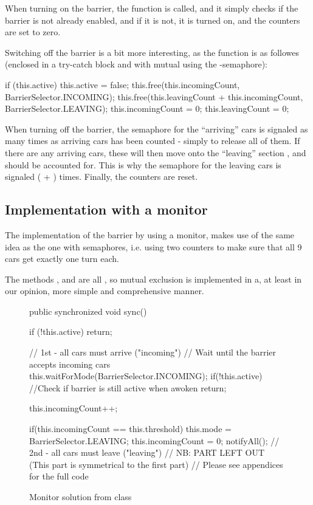 When turning on the barrier, the function  is called, and
it simply checks if the barrier is not already enabled, and if it is
not, it is turned on, and the counters are set to zero.

Switching off the barrier is a bit more interesting, as the function
 is as followes (enclosed in a try-catch block and with
mutual using the -semaphore):

\begin{java}
if (this.active) {
	this.active = false;
	this.free(this.incomingCount, BarrierSelector.INCOMING);
	this.free(this.leavingCount + this.incomingCount, BarrierSelector.LEAVING);
	this.incomingCount = 0;
	this.leavingCount = 0;
}
\end{java}

When turning off the barrier, the semaphore for the ``arriving'' cars
is signaled as many times as arriving cars has been counted - simply
to release all of them. If there are any arriving cars, these will
then move onto the ``leaving'' section , and should be
accounted for. This is why the semaphore for the leaving cars is
signaled ( + ) times. Finally,
the counters are reset.

\subsection{Implementation with a monitor}
\label{sub:bar-moni}
The implementation of the barrier by using a monitor, makes use of the
same idea as the one with semaphores, i.e. using two counters to make
sure that all 9 cars get exactly one turn each.

The methods ,  and  are all
, so mutual exclusion is implemented in a, at least
in our opinion, more simple and comprehensive manner.

\begin{figure}[H]
\begin{java}
public synchronized void sync() {
	if (!this.active)
		return;

	// 1st - all cars must arrive ("incoming")
	// Wait until the barrier accepts incoming cars
	this.waitForMode(BarrierSelector.INCOMING);
	if(!this.active) //Check if barrier is still active when awoken
		return;

	this.incomingCount++;

	if(this.incomingCount == this.threshold) {
		this.mode = BarrierSelector.LEAVING;
		this.incomingCount = 0;
		notifyAll();
	}	// 2nd - all cars must leave ("leaving")
	// NB: PART LEFT OUT (This part is symmetrical to the first part)
	// Please see appendices for the full code
}
\end{java}
\caption{Monitor solution from  class}
\label{lst:bar-moni}
\end{figure}


